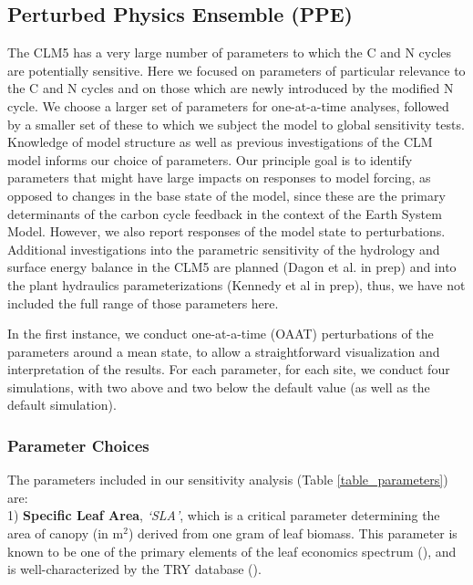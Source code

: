 \documentclass[draft,linenumbers]{agujournal}
\begin{document}
\subsection{Perturbed Physics Ensemble (PPE)}

The CLM5 has a very large number of parameters to which the C and N cycles are potentially sensitive. Here we focused on parameters of particular relevance to the C and N cycles and on those which are newly introduced by the modified N cycle. We choose a larger set of parameters for one-at-a-time analyses, followed by a smaller set of these to which we subject the model to global sensitivity tests. Knowledge of model structure as well as previous investigations of the CLM model informs our choice of parameters. Our principle goal is to identify parameters that might have large impacts on responses to model forcing, as opposed to changes in the base state of the model, since these are the primary determinants of the carbon cycle feedback in the context of the Earth System Model. However, we also report responses of the model state to perturbations. Additional investigations into the parametric sensitivity of the hydrology and surface energy balance in the CLM5 are planned (Dagon et al. in prep) and into the plant hydraulics parameterizations (Kennedy et al in prep), thus, we have not included the full range of those parameters here.


In the first instance, we conduct one-at-a-time (OAAT) perturbations of the parameters around a mean state, to allow a straightforward visualization and interpretation of the results. For each parameter, for each site, we conduct four simulations, with two above and two below the default value (as well as the default simulation).


\subsubsection{Parameter Choices}

The parameters included in our sensitivity analysis (Table \ref{table_parameters}) are: \\

1) \textbf{Specific Leaf Area}, \emph{`SLA'}, which is a critical parameter determining the area of canopy (in m$^{2}$) derived from one gram of leaf biomass. This parameter is known to be one of the primary elements of the leaf economics spectrum (\cite{wright2004}), and is well-characterized by the TRY database (\cite{kattge2011}).\\
\end{document}
